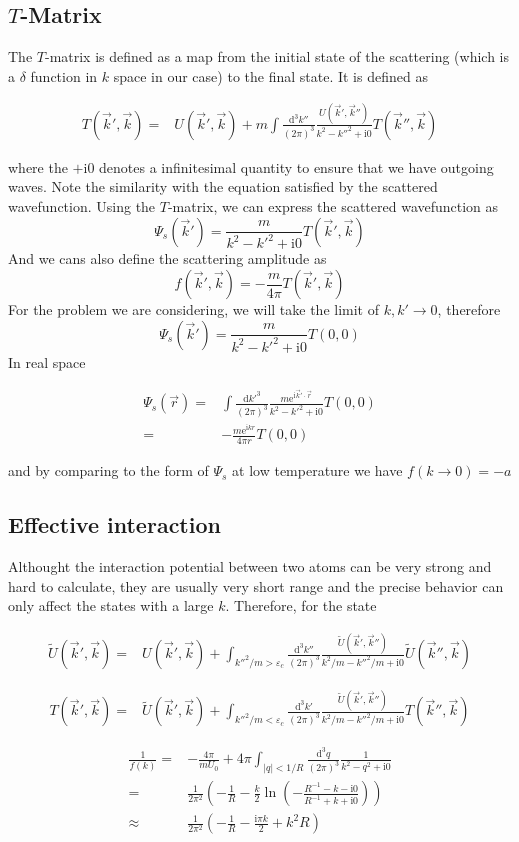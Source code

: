 \documentclass[aps,twocolumn,secnumarabic,balancelastpage,amsmath,amssymb,nofootinbib]{revtex4}
\newcommand{\ud}{\mathrm{d}}
\newcommand{\ue}{\mathrm{e}}
\newcommand{\ui}{\mathrm{i}}
\newcommand{\eqar}[1]
{
  \begin{align*}
    #1
  \end{align*}
}
\newcommand{\paren}[1]{{\left({#1}\right)}}
\newcommand{\abs}[1]{{\left|{#1}\right|}}
\begin{document}
\subsection{$T$-Matrix}
The $T$-matrix is defined as a map from the initial state of the scattering (which is a $\delta$ function in $k$ space in our case) to the final state. It is defined as
\eqar{
  T\paren{\vec k', \vec k}=&U\paren{\vec k', \vec k}+m\int\frac{\ud^3k''}{\paren{2\pi}^3}\frac{U\paren{\vec k', \vec k''}}{k^2-k''^2+\ui 0}T\paren{\vec k'', \vec k}}
where the $+\ui 0$ denotes a infinitesimal quantity to ensure that we have outgoing waves. Note the similarity with the equation satisfied by the scattered wavefunction. Using the $T$-matrix, we can express the scattered wavefunction as
\[\Psi_s\paren{\vec k'}=\frac{m}{k^2-k'^2+\ui 0}T\paren{\vec k', \vec k}\]
And we cans also define the scattering amplitude as
\[f\paren{\vec k', \vec k}=-\frac{m}{4\pi}T\paren{\vec k', \vec k}\]
For the problem we are considering, we will take the limit of $k, k'\rightarrow0$, therefore
\[\Psi_s\paren{\vec k'}=\frac{m}{k^2-k'^2+\ui 0}T\paren{0, 0}\]
In real space
\eqar{
  \Psi_s\paren{\vec r}=&\int\frac{\ud k'^3}{\paren{2\pi}^3}\frac{m\ue^{\ui\vec k'\cdot\vec r}}{k^2-k'^2+\ui 0}T\paren{0, 0}\\
  =&-\frac{m\ue^{\ui kr}}{4\pi r}T\paren{0, 0}
}
and by comparing to the form of $\Psi_s$ at low temperature we have $f(k\rightarrow0)=-a$

\subsection{Effective interaction}
Althought the interaction potential between two atoms can be very strong and hard to calculate, they are usually very short range and the precise behavior can only affect the states with a large $k$. Therefore, for the state

\eqar{
  \tilde U\paren{\vec k', \vec k}=&U\paren{\vec k', \vec k}+\int_{k''^2/m>\varepsilon_c}\frac{\ud^3 k''}{\paren{2\pi}^3}\frac{\tilde U\paren{\vec k', \vec k''}}{k^2/m-k''^2/m+\ui 0}\tilde U\paren{\vec k'', \vec k}
}
\eqar{
  T\paren{\vec k', \vec k}=&\tilde U\paren{\vec k', \vec k}+\int_{k''^2/m<\varepsilon_c}\frac{\ud^3 k'}{\paren{2\pi}^3}\frac{\tilde U\paren{\vec k', \vec k''}}{k^2/m-k''^2/m+\ui0}T\paren{\vec k'', \vec k}
}
\eqar{
  \frac{1}{f\paren{k}}=&-\frac{4\pi}{mU_0}+4\pi\int_{\abs{q}<1/R}\frac{\ud^3q}{\paren{2\pi}^3}\frac{1}{k^2-q^2+\ui0}\\
  =&\frac{1}{2\pi^2}\paren{-\frac{1}{R}-\frac{k}{2}\ln\paren{-\frac{R^{-1}-k-\ui0}{R^{-1}+k+\ui0}}}\\
  \approx&\frac{1}{2\pi^2}\paren{-\frac{1}{R}-\frac{\ui\pi k}{2}+k^2R}
}
\end{document}
